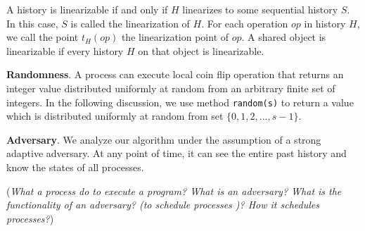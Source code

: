 A history is linearizable if and only if $H$ linearizes to some sequential history $S$. In this case,
$S$ is called the linearization of $H$. For each operation $op$ in history $H$, we call the point $t_H(op)$ 
the linearization point of $op$. A shared object is linearizable if every history $H$ on that object is linearizable.



\textbf{Randomness}.
A process can execute local coin flip operation that returns an integer value distributed
uniformly at random from an arbitrary finite set of integers. In the following discussion, we use method
\texttt{random(s)} to return a value which is distributed uniformly at random from set $\{0, 1, 2,..., s-1\}$.



\textbf{Adversary}.
We analyze our algorithm under the assumption of a strong adaptive adversary. At any
point of time, it can see the entire past history and know the states of all processes.

(\emph{What a process do to execute a program? What is an adversary? What is the functionality of an adversary? (to schedule processes )? 
How it schedules processes?})


